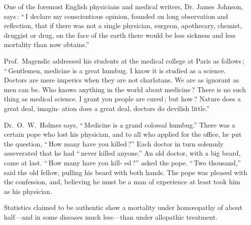 \documentclass[10pt]{article}
\begin{document}
\begin{multicols}{3}
One of the foremost English physicians and medical writers, Dr.\linebreak
James Johnson, says\,: ``\,I declare my conscientious opinion, founded on\linebreak
long observation and reflection, that if there was not a single physician,\linebreak
surgeon, apothecary, chemist, druggist or drug, on the face of the earth\linebreak
there would be less sickness and less mortality than now obtains.''

Prof.~Magendic addressed his students at the medical college at Paris\linebreak
as follows\,; ``\,Gentlemen, medicine is a great humbug. I know it is\linebreak
studied as a science. Doctors are mere imperics when they are not\linebreak
charlatans. We are as ignorant as men can be. Who knows anything in\linebreak
the world about medicine\,? There is no such thing as medical science. I\linebreak
grant you people are cured\,; but how\,? Nature does a great deal, imagin-\linebreak
ation does a great deal, doctors do devilish little.''

Dr.~O.~W.~Holmes says, ``\,Medicine is a grand colossal humbug.''\linebreak
There was a certain pope who lost his physician, and to all who applied for\linebreak
the office, he put the question, ``\,How many have you killed\,?'' Each\linebreak
doctor in turn solemnly asseverated that he had ``\,never killed anyone.''\linebreak
An old doctor, with a big beard, came at last. ``\,How many have you kill-\linebreak
ed\,?'' asked the pope. ``\,Two thousand,'' said the old fellow, pulling his\linebreak
beard with both hands. The pope was pleased with the confession, and,\linebreak
believing he must be a man of experience at least took him as his physician.

Statistics claimed to be authentic show a mortality under hom{\oe}opathy\linebreak
of about half---and in some diseases much less---than under allopathic\linebreak
treatment.


\end{multicols}
\end{document}
